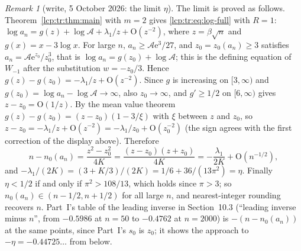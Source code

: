 \documentclass[11pt]{article}
\numberwithin{equation}{section}
\theoremstyle{definition}\newtheorem{definition}[theorem]{Definition}
\theoremstyle{remark}\newtheorem{remark}[theorem]{Remark}
\newcommand{\OO}{\mathrm O}
\newcommand{\ee}{\mathrm e}
\begin{document}
\begin{remark}[write, 5 October 2026: the limit $\eta$]\label{lcp:tr:rem:eta}
The limit is proved as follows. Theorem~\ref{lcp:tr:thm:main} with $m=2$
gives \eqref{lcp:tr:eq:log-full} with $R=1$:
$\log a_n=g(z)+\log\mathcal A+\lambda_1/z+\OO(z^{-2})$, where $z=\beta\sqrt n$
and $g(x)=x-3\log x$. For large $n$, $a_n\ge\mathcal A\ee^3/27$, and
$z_0=z_0(a_n)\ge3$ satisfies $a_n=\mathcal A\ee^{z_0}/z_0^3$, that is
$\log a_n=g(z_0)+\log\mathcal A$; this is the defining equation of $W_{-1}$
after the substitution $w=-z_0/3$. Hence $g(z)-g(z_0)=-\lambda_1/z+\OO(z^{-2})$.
Since $g$ is increasing on $[3,\infty)$ and
$g(z_0)=\log a_n-\log\mathcal A\to\infty$, also $z_0\to\infty$, and
$g'\ge1/2$ on $[6,\infty)$ gives $z-z_0=\OO(1/z)$. By
the mean value theorem $g(z)-g(z_0)=(z-z_0)(1-3/\xi)$ with $\xi$ between
$z$ and $z_0$, so $z-z_0=-\lambda_1/z+\OO(z^{-2})=-\lambda_1/z_0+\OO(z_0^{-2})$
(the sign agrees with the first correction of the display above). Therefore
\[
 n-n_0(a_n)=\frac{z^2-z_0^2}{4K}=\frac{(z-z_0)(z+z_0)}{4K}
 =-\frac{\lambda_1}{2K}+\OO(n^{-1/2}),
\]
and $-\lambda_1/(2K)=(3+K/3)/(2K)=1/6+36/(13\pi^2)=\eta$. Finally
$\eta<1/2$ if and only if $\pi^2>108/13$, which holds since $\pi>3$; so
$n_0(a_n)\in(n-1/2,n+1/2)$ for all large $n$, and nearest-integer rounding
recovers $n$. Part~I's table of the leading inverse in Section~10.3
(``leading inverse minus $n$'', from $-0.5986$ at $n=50$ to $-0.4762$ at
$n=2000$) is $-(n-n_0(a_n))$ at the same points, since Part~I's $s_0$ is
$z_0$; it shows the approach to $-\eta=-0.44725\ldots$ from below.
\end{remark}
\end{document}

